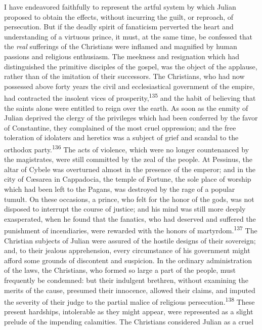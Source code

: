 I have endeavored faithfully to represent the artful system by
which Julian proposed to obtain the effects, without incurring
the guilt, or reproach, of persecution. But if the deadly spirit
of fanaticism perverted the heart and understanding of a virtuous
prince, it must, at the same time, be confessed that the \textit{real}
sufferings of the Christians were inflamed and magnified by human
passions and religious enthusiasm. The meekness and resignation
which had distinguished the primitive disciples of the gospel,
was the object of the applause, rather than of the imitation of
their successors. The Christians, who had now possessed above
forty years the civil and ecclesiastical government of the
empire, had contracted the insolent vices of prosperity,\textsuperscript{135} and
the habit of believing that the saints alone were entitled to
reign over the earth. As soon as the enmity of Julian deprived
the clergy of the privileges which had been conferred by the
favor of Constantine, they complained of the most cruel
oppression; and the free toleration of idolaters and heretics was
a subject of grief and scandal to the orthodox party.\textsuperscript{136} The
acts of violence, which were no longer countenanced by the
magistrates, were still committed by the zeal of the people. At
Pessinus, the altar of Cybele was overturned almost in the
presence of the emperor; and in the city of Cæsarea in
Cappadocia, the temple of Fortune, the sole place of worship
which had been left to the Pagans, was destroyed by the rage of a
popular tumult. On these occasions, a prince, who felt for the
honor of the gods, was not disposed to interrupt the course of
justice; and his mind was still more deeply exasperated, when he
found that the fanatics, who had deserved and suffered the
punishment of incendiaries, were rewarded with the honors of
martyrdom.\textsuperscript{137} The Christian subjects of Julian were assured of
the hostile designs of their sovereign; and, to their jealous
apprehension, every circumstance of his government might afford
some grounds of discontent and suspicion. In the ordinary
administration of the laws, the Christians, who formed so large a
part of the people, must frequently be condemned: but their
indulgent brethren, without examining the merits of the cause,
presumed their innocence, allowed their claims, and imputed the
severity of their judge to the partial malice of religious
persecution.\textsuperscript{138} These present hardships, intolerable as they
might appear, were represented as a slight prelude of the
impending calamities. The Christians considered Julian as a cruel
